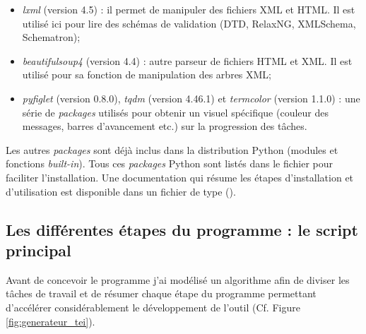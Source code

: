 \begin{itemize}
    \item \textit{lxml} (version 4.5) : il permet de manipuler des fichiers XML et HTML. Il est utilisé ici pour lire des schémas de validation (DTD, RelaxNG, XMLSchema, Schematron);
    \item \textit{beautifulsoup4} (version 4.4) : autre parseur de fichiers HTML et XML. Il est utilisé pour sa fonction de manipulation des arbres XML;
    \item \textit{pyfiglet} (version 0.8.0), \textit{tqdm} (version 4.46.1) et \textit{termcolor} (version 1.1.0) : une série de \textit{packages} utilisés pour obtenir un visuel spécifique (couleur des messages, barres d'avancement etc.) sur la progression des tâches.
\end{itemize}
\bigskip
Les autres \textit{packages} sont déjà inclus dans la distribution Python (modules et fonctions \textit{built-in}). Tous ces \textit{packages} Python sont listés dans le fichier  pour faciliter l'installation. Une documentation qui résume les étapes d'installation et d'utilisation est disponible dans un fichier de type  ().\\

\subsection{Les différentes étapes du programme : le script principal }

Avant de concevoir le programme j'ai modélisé un algorithme afin de diviser les tâches de travail et de résumer chaque étape du programme permettant d'accélérer considérablement le développement de l'outil (Cf. Figure \ref{fig:generateur_tei}).\\

